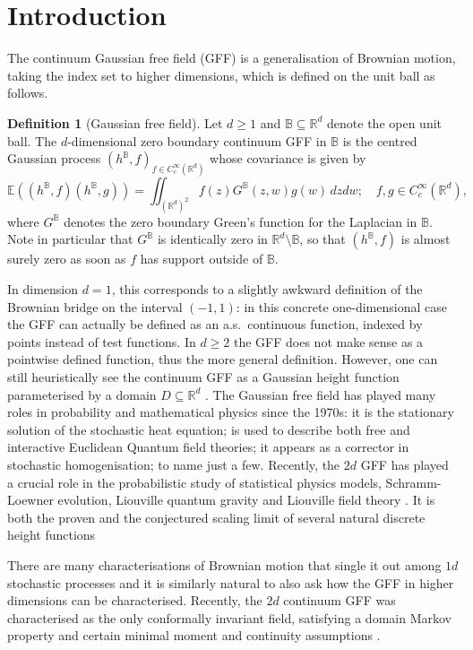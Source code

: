 \documentclass[JEP,XML,SOM,Unicode,published]{cedram}
\theoremstyle{definition}
\newtheorem{definition}[theorem]{Definition}
\newcommand{\R}{\mathbb{R}}
\newcommand{\E}{\mathbb{E}}
\newcommand{\B}{\mathbb{B}}\let\D\B\let\Ub\B
\begin{document}
\vspace*{-2\baselineskip}
\mbox{}

\section{Introduction}
The continuum Gaussian free field (GFF) is a generalisation of Brownian motion, taking the index set to higher dimensions, which is defined on the unit ball as follows.

\begin{definition}[Gaussian free field]
Let $d \geq 1$ and $\D \subseteq \R^d$ denote the open unit ball. The $d$-dimensional zero boundary continuum GFF in $\D$ is the centred Gaussian process $(h^{\D},f)_{f\in C_c^\infty(\R^d)}$ whose covariance is given by
\[
\E((h^{\D},f)(h^{\D},g)) = \iint_{(\R^d)^2} f(z)G^{\B}(z,w)g(w)\, dz dw;\quad f,g\in C_c^\infty(\R^d),
\]
where $G^{\D}$ denotes the zero boundary Green's function for the Laplacian in $\D$. Note in particular that $G^\D$ is identically zero in $\R^d\setminus \D$, so that $(h^\B,f)$ is almost surely zero as soon as $f$ has support outside of $\D$.
\end{definition}

In dimension $d = 1$, this corresponds to a slightly awkward definition of the Brownian bridge on the interval $(-1,1)$: in this concrete one-dimensional case the GFF can actually be defined as an a.s.\ continuous function, \ie indexed by points instead of test functions. In $d \geq 2$ the GFF does not make sense as a pointwise defined function, thus the more general definition. However, one can still heuristically see the continuum GFF as a Gaussian height function parameterised by a domain $D \subseteq \R^d$ \cite{SheffieldGFF}. The Gaussian free field has played many roles in probability and mathematical physics since the 1970s: it is the stationary solution of the stochastic heat equation; is used to describe both free and interactive Euclidean Quantum field theories; it appears as a corrector in stochastic homogenisation; to name just a few. Recently, the $2d$ GFF has played a crucial role in the probabilistic study of statistical physics models, Schramm-Loewner evolution, Liouville quantum gravity and Liouville field theory \cite{Dub, MS3, DS11, DKRV}. It is both the proven and the conjectured scaling limit of several natural discrete height functions \cite{NS, Kenyon_GFF, RiderVirag,BLR}

There are many characterisations of Brownian motion that single it out among $1d$ stochastic processes and it is similarly natural to also ask how the GFF in higher dimensions can be characterised. Recently, the $2d$ continuum GFF was characterised as the only conformally invariant field, satisfying a domain Markov property and certain minimal moment and continuity assumptions \cite{BPR18,BPR20}.
\end{document}
